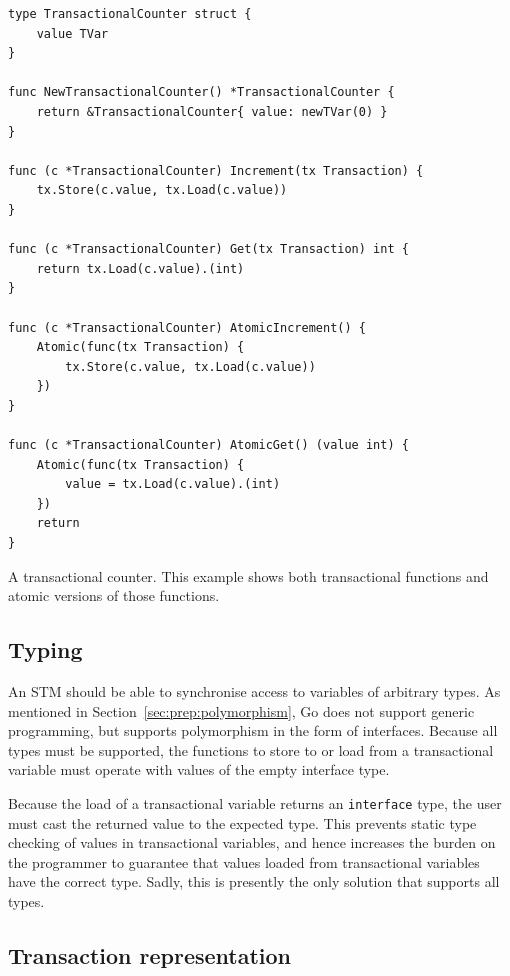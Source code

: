 \documentclass[12pt,a4paper,oneside,openright]{report}
\newcommand{\mycaption}[2]{\caption[#1]{#1 #2}}
\newcommand{\goType}[1]{\texttt{#1}}
\begin{document}
\begin{Listing}[hbtp]
\begin{lstlisting}
type TransactionalCounter struct {
    value TVar
}

func NewTransactionalCounter() *TransactionalCounter {
    return &TransactionalCounter{ value: newTVar(0) }
}

func (c *TransactionalCounter) Increment(tx Transaction) {
    tx.Store(c.value, tx.Load(c.value))
}

func (c *TransactionalCounter) Get(tx Transaction) int {
    return tx.Load(c.value).(int)
}

func (c *TransactionalCounter) AtomicIncrement() {
    Atomic(func(tx Transaction) {
        tx.Store(c.value, tx.Load(c.value))  
    })
}

func (c *TransactionalCounter) AtomicGet() (value int) {
    Atomic(func(tx Transaction) {
        value = tx.Load(c.value).(int)    
    })
    return 
}
\end{lstlisting}

  \mycaption{A transactional counter.}{This example shows both
    transactional functions and atomic versions of those functions.}
  \label{lst:counter}
\end{Listing}


\subsection{Typing}
\label{sec:typing}

An STM should be able to synchronise access to variables of arbitrary
types. As mentioned in Section~\ref{sec:prep:polymorphism}, Go does
not support generic programming, but supports polymorphism in the form
of interfaces. Because all types must be supported, the functions to
store to or load from a transactional variable must operate with
values of the empty interface type.

Because the load of a transactional variable returns an
\goType{interface\string{\string}} type, the user must cast the
returned value to the expected type. This prevents static type
checking of values in transactional variables, and hence increases the
burden on the programmer to guarantee that values loaded from
transactional variables have the correct type. Sadly, this is
presently the only solution that supports all types.

\subsection{Transaction representation}
\label{sec:expl-trans-objects}
\end{document}
